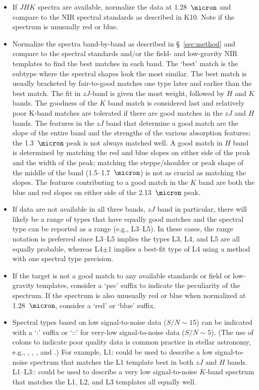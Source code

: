 \documentclass[12pt,preprint]{aastex}
\begin{document}
\begin{itemize}
	\item If $JHK$ spectra are available, normalize the data at 1.28~$\micron$ and compare to the NIR spectral standards as described in K10. Note if the spectrum is unusually red or blue.

	\item Normalize the spectra band-by-band as described in \S~\ref{sec:method} and compare to the spectral standards and/or the field- and low-gravity NIR templates to find the best matches in each band.
	The `best' match is the subtype where the spectral shapes look the most similar. The best match is usually bracketed by fair-to-good matches one type later and earlier than the best match.
	The fit in $zJ$-band is given the most weight, followed by $H$ and $K$ bands. The goodness of the $K$ band match is considered last and relatively poor K-band matches are tolerated if there are good matches in the $zJ$ and $H$ bands.
	The features in the $zJ$ band that determine a good match are the slope of the entire band and the strengths of the various absorption features; the 1.3~$\micron$ peak is not always matched well.
	A good match in $H$ band is determined by matching the red and blue slopes on either side of the peak and the width of the peak; matching the steppe/shoulder or peak shape of the middle of the band (1.5--1.7~$\micron$) is not as crucial as matching the slopes.
The features contributing to a good match in the $K$ band are both the blue and red slopes on either side of the 2.13~$\micron$ peak.
	\item If data are not available in all three bands, $zJ$ band in particular, there will likely be a range of types that have equally good matches and the spectral type can be reported as a range (e.g., L3--L5). In these cases, the range notation is preferred since L3--L5 implies the types L3, L4, and L5 are all equally probable, whereas L4$\pm$1 implies a best-fit type of L4 using a method with one spectral type precision.
	\item If the target is not a good match to any available standards or field or low-gravity templates, consider a `pec' suffix to indicate the peculiarity of the spectrum. If the spectrum is also unusually red or blue when normalized at 1.28~$\micron$, consider a `red' or `blue' suffix.
	\item Spectral types based on low signal-to-noise data ($S/N\sim15$) can be indicated with a `:' suffix or `::' for very-low signal-to-noise data ($S/N\sim5$).
	(The use of colons to indicate poor quality data is common practice in stellar astronomy, e.g., \citet{Sanduleak:1988fn}, \cite{Silvestri:2006el}, \citet[Table 12.1]{Gray:2009wd}, and \cite{Covey:2010de}.) For example, L1: could be used to describe a low signal-to-noise spectrum that matches the L1 template best in both $zJ$ and $H$ bands. L1--L3:: could be used to describe a very low signal-to-noise $K$-band spectrum that matches the L1, L2, and L3 templates all equally well. %

\end{itemize}
\end{document}
